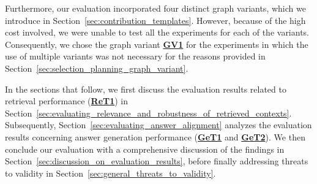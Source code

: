 Furthermore, our evaluation incorporated four distinct graph variants, which we introduce in Section~\ref{sec:contribution_templates}. However, because of the high cost involved, we were unable to test all the experiments for each of the variants. Consequently, we chose the graph variant \hyperref[enum:gv1]{\textbf{GV1}} for the experiments in which the use of multiple variants was not necessary for the reasons provided in Section~\ref{sec:selection_planning_graph_variant}.

In the sections that follow, we first discuss the evaluation results related to retrieval performance (\hyperref[sec:evaluation_goals_and_metrics]{\textbf{ReT1}}) in Section~\ref{sec:evaluating_relevance_and_robustness_of_retrieved_contexts}. Subsequently, Section~\ref{sec:evaluating_answer_alignment} analyzes the evaluation results concerning answer generation performance (\hyperref[sec:evaluation_goals_and_metrics]{\textbf{GeT1}} and \hyperref[sec:evaluation_goals_and_metrics]{\textbf{GeT2}}). We then conclude our evaluation with a comprehensive discussion of the findings in Section~\ref{sec:discussion_on_evaluation_results}, before finally addressing threats to validity in Section~\ref{sec:general_threats_to_validity}.












